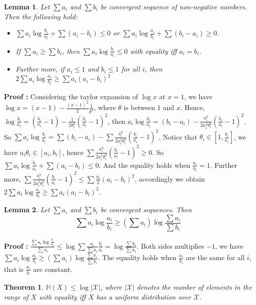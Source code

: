 \documentclass[11pt]{article}
\newtheorem{theorem}{Theorem}[section]
\newtheorem{lemma}{Lemma}[section]
\begin{document}
\begin{lemma}
Let $\sum a_{i}$ and $\sum b_{i}$ be convergent sequence of non-negative numbers. Then the following hold:
\begin{itemize}
\item $\sum a_{i} \log \frac{b_{i}}{a_{i}}+\sum(a_{i}-b_{i})\leq 0$ or $\sum a_{i} \log \frac{a_{i}}{b_{i}}+\sum(b_{i}-a_{i})\geq 0$.
\item If $\sum a_{i}\geq \sum b_{i}$, then $\sum a_{i} \log \frac{b_{i}}{a_{i}}\leq0$ with equality iff $a_{i}=b_{i}$.
\item Further more, if $a_{i}\leq 1$ and $b_{i} \leq 1$ for all $i$, then $2\sum a_{i} \log \frac{a_{i}}{b_{i}}\geq\sum a_{i}(a_{i}-b_{i})^2$
\end{itemize}
\end{lemma}
{\bf Proof :} Considering the taylor expansion of $\log x$ at $x=1$, we have $\log x =(x-1)-\frac{(x-1)^2}{2}\frac{1}{\theta^2}$, where $\theta$ is between $1$ and $x$.
Hence, $\log \frac{b_{i}}{a_{i}}=(\frac{b_{i}}{a_{i}}-1)-\frac{1}{2\theta_{i}^2}(\frac{b_{i}}{a_{i}}-1)^2$, then $a_{i}\log \frac{b_{i}}{a_{i}}=(b_{i}-a_{i})-\frac{a_{i}^3}{2a_{i}^2\theta_{i}^2}(\frac{b_{i}}{a_{i}}-1)^2$. So $\sum a_{i}\log \frac{b_{i}}{a_{i}}=\sum(b_{i}-a_{i})-\sum\frac{a_{i}^3}{2a_{i}^2\theta_{i}^2}(\frac{b_{i}}{a_{i}}-1)^2$. Notice that $\theta_{i}\in\left[1,\frac{b_{i}}{a_{i}}\right]$, we have $a_{i}\theta_{i}\in \left[a_{i},b_{i}\right]$, hence $\sum\frac{a_{i}^3}{2a_{i}^2\theta_{i}^2}(\frac{b_{i}}{a_{i}}-1)^2\geq0$. So
$\sum a_{i} \log \frac{b_{i}}{a_{i}}+\sum(a_{i}-b_{i}) \leq0$. And the equality holds when $\frac{a_{i}}{b_{i}}=1$. Further more, $\sum\frac{a_{i}^3}{2a_{i}^2\theta_{i}^2}(\frac{b_{i}}{a_{i}}-1)^2 \leq \sum\frac{a_{i}}{2}(a_{i}-b_{i})^2$, accordingly we obtain $2\sum a_{i} \log \frac{a_{i}}{b_{i}}\geq\sum a_{i}(a_{i}-b_{i})^2$.
\begin{lemma}
Let $\sum a_{i}$ and $\sum b_{i}$ be convergent sequences. Then
$$\sum a_{i}\log \frac{a_{i}}{b_{i}}\geq (\sum a_{i})\log \frac{\sum a_{i}}{\sum b_{i}}$$
\end{lemma}
{\bf Proof :} $\frac{\sum a_{i}\log \frac{b_{i}}{a_{i}}}{\sum a_{i}}\leq\log\sum\frac{a_{i}}{\sum a_{i}}\frac{b_{i}}{a_{i}}=\log \frac{\sum b_{i}}{\sum a_{i}}$. Both sides multiplies $-1$, we have $\sum a_{i}\log \frac{a_{i}}{b_{i}}\geq (\sum a_{i})\log \frac{\sum a_{i}}{\sum b_{i}}$. The equality holds when $\frac{a_{i}}{b_{i}}$ are the same for all $i$, that is $\frac{a_{i}}{b_{i}}$ are constant.
\begin{theorem}
$\mathbb{H}(X)\leq \log |\mathcal{X}|$, where $|\mathcal{X}|$ denotes the number of elements in the range of $X$ with equality iff $X$ has a uniform distribution over $\mathcal{X}$.
\end{theorem}
\end{document}
